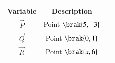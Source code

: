 \begin{tabular}{|c|c|c|}
\hline
\textbf{Variable} & \textbf{Description} \\
\hline
$\vec{P}$ & Point $\brak{5,-3}$ \\
\hline
$\vec{Q}$ & Point $\brak{0,1}$ \\
\hline
$\vec{R}$ & Point $\brak{x,6}$ \\
\hline
\end{tabular}